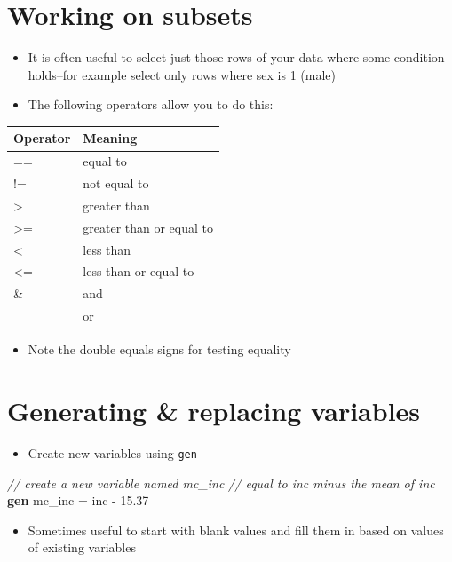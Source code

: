 \documentclass[]{book}
\newenvironment{Shaded}{\begin{snugshade}}{\end{snugshade}}
\newcommand{\CommentTok}[1]{\textcolor[rgb]{0.56,0.35,0.01}{\textit{#1}}}
\newcommand{\KeywordTok}[1]{\textcolor[rgb]{0.13,0.29,0.53}{\textbf{#1}}}
\newcommand{\NormalTok}[1]{#1}
\providecommand{\tightlist}{%
  \setlength{\itemsep}{0pt}\setlength{\parskip}{0pt}}
\begin{document}
\hypertarget{working-on-subsets}{%
\section{Working on subsets}\label{working-on-subsets}}

\begin{itemize}
\tightlist
\item
  It is often useful to select just those rows of your data where some condition holds--for example select only rows where sex is 1 (male)
\item
  The following operators allow you to do this:
\end{itemize}

\begin{longtable}[]{@{}ll@{}}
\toprule
Operator & Meaning\tabularnewline
\midrule
\endhead
== & equal to\tabularnewline
!= & not equal to\tabularnewline
\textgreater{} & greater than\tabularnewline
\textgreater= & greater than or equal to\tabularnewline
\textless{} & less than\tabularnewline
\textless= & less than or equal to\tabularnewline
\& & and\tabularnewline
\textbar{} & or\tabularnewline
\bottomrule
\end{longtable}

\begin{itemize}
\tightlist
\item
  Note the double equals signs for testing equality
\end{itemize}

\hypertarget{generating-replacing-variables}{%
\section{Generating \& replacing variables}\label{generating-replacing-variables}}

\begin{itemize}
\tightlist
\item
  Create new variables using \texttt{gen}
\end{itemize}

\begin{Shaded}
\begin{Highlighting}[]
  \CommentTok{// create a new variable named mc_inc}
  \CommentTok{//   equal to inc minus the mean of inc}
  \KeywordTok{gen}\NormalTok{ mc_inc = inc - 15.37  }
\end{Highlighting}
\end{Shaded}

\begin{itemize}
\tightlist
\item
  Sometimes useful to start with blank values and fill them in based on values of existing variables
\end{itemize}
\end{document}
